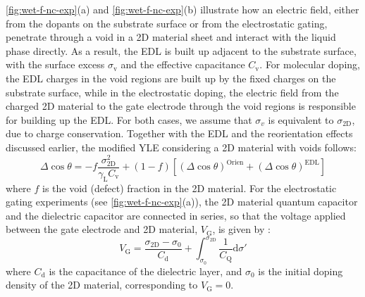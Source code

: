\autoref{fig:wet-f-nc-exp}(a) and \autoref{fig:wet-f-nc-exp}(b) illustrate how
an electric field, either from the dopants on the substrate surface or
from the electrostatic gating, penetrate through a void in a 2D
material sheet and interact with the liquid phase directly. As a
result, the EDL is built up adjacent to the substrate surface, with
the surface excess \(\sigma_{\mathrm{v}}\) and the effective
capacitance \(C_{\mathrm{v}}\).  For molecular doping, the EDL charges
in the void regions are built up by the fixed charges on the substrate
surface, while in the electrostatic doping, the electric field from
the charged 2D material to the gate electrode through the void regions
is responsible for building up the EDL. For both cases, we assume that
\(\sigma_{v}\) is equivalent to \(\sigma_{\mathrm{2D}}\), due to
charge conservation. Together with the EDL and the reorientation
effects discussed earlier, the modified YLE considering a 2D material
with voids follows:
\begin{equation}
\label{eqn:wet-def-Delta-cos-mixture}
\Delta \cos \theta = -f\frac{\sigma_{\mathrm{2D}}^{2}}{\gamma_{\mathrm{L}} C_{\mathrm{v}}} 
                     + (1-f)[(\Delta \cos \theta)^{\mathrm{Orien}} + (\Delta \cos \theta)^{\mathrm{EDL}}]
\end{equation}
where \(f\) is the void (defect) fraction in the 2D material. For the
electrostatic gating experiments (see 
\autoref{fig:wet-f-nc-exp}(a)), the 2D material quantum capacitor
and the dielectric  capacitor are connected in
series, so that the voltage applied between the gate electrode and
2D material, \(V_{\mathrm{G}}\), is given by :
\begin{equation}
\label{eqn:wet-VG-gating}
V_{\mathrm{G}} = \frac{\sigma_{\mathrm{2D}} - \sigma_{\mathrm{0}}}{C_{\mathrm{d}}}
                  + \int_{\sigma_{0}}^{\sigma_{\mathrm{2D}}} \frac{1}{C_{\mathrm{Q}}} \mathrm{d}\sigma'
\end{equation}
where \(C_{\mathrm{d}}\) is the capacitance of the dielectric layer, and
\(\sigma_{0}\) is the initial doping density of the 2D material,
corresponding to \(V_{\mathrm{G}}=0\).


